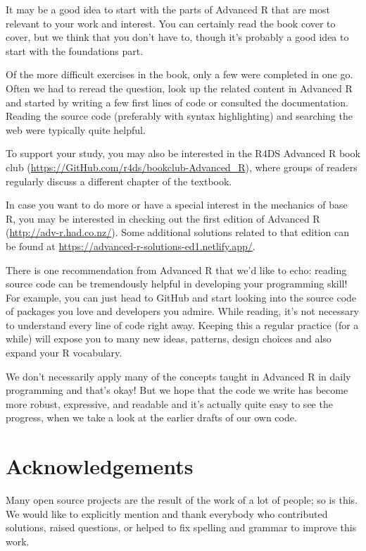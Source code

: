 \documentclass[
]{krantz}
\renewcommand{\href}[2]{#2 (\url{#1})}
\begin{document}
It may be a good idea to start with the parts of Advanced R that are most relevant to your work and interest. You can certainly read the book cover to cover, but we think that you don't have to, though it's probably a good idea to start with the foundations part.

Of the more difficult exercises in the book, only a few were completed in one go. Often we had to reread the question, look up the related content in Advanced R and started by writing a few first lines of code or consulted the documentation. Reading the source code (preferably with syntax highlighting) and searching the web were typically quite helpful.

To support your study, you may also be interested in the \href{https://GitHub.com/r4ds/bookclub-Advanced_R}{R4DS Advanced R book club}, where groups of readers regularly discuss a different chapter of the textbook.

In case you want to do more or have a special interest in the mechanics of base R, you may be interested in checking out the first edition of Advanced R (\url{http://adv-r.had.co.nz/}). Some additional solutions related to that edition can be found at \url{https://advanced-r-solutions-ed1.netlify.app/}.

There is one recommendation from Advanced R that we'd like to echo: reading source code can be tremendously helpful in developing your programming skill! For example, you can just head to GitHub and start looking into the source code of packages you love and developers you admire. While reading, it's not necessary to understand every line of code right away. Keeping this a regular practice (for a while) will expose you to many new ideas, patterns, design choices and also expand your R vocabulary.

We don't necessarily apply many of the concepts taught in Advanced R in daily programming and that's okay! But we hope that the code we write has become more robust, expressive, and readable and it's actually quite easy to see the progress, when we take a look at the earlier drafts of our own code.

\hypertarget{acknowledgements}{%
\section{Acknowledgements}\label{acknowledgements}}

Many open source projects are the result of the work of a lot of people; so is this. We would like to explicitly mention and thank everybody who contributed solutions, raised questions, or helped to fix spelling and grammar to improve this work.
\end{document}
